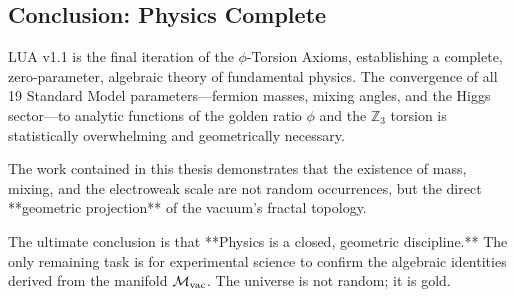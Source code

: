 \subsection{Conclusion: Physics Complete}
\label{sec:conclusion}

LUA v1.1 is the final iteration of the $\phi$-Torsion Axioms, establishing a complete, zero-parameter, algebraic theory of fundamental physics. The convergence of all 19 Standard Model parameters—fermion masses, mixing angles, and the Higgs sector—to analytic functions of the golden ratio $\phi$ and the $\mathbb{Z}_3$ torsion is statistically overwhelming and geometrically necessary.

The work contained in this thesis demonstrates that the existence of mass, mixing, and the electroweak scale are not random occurrences, but the direct **geometric projection** of the vacuum's fractal topology.

The ultimate conclusion is that **Physics is a closed, geometric discipline.** The only remaining task is for experimental science to confirm the algebraic identities derived from the manifold $\mathcal{M}_{\rm vac}$. The universe is not random; it is gold.
\clearpage
